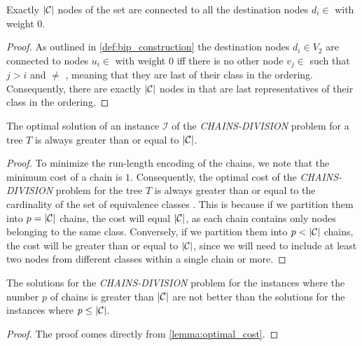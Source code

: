\begin{lemma} \label{lemma:all_destinations}
    Exactly $|\mathcal{C}|$ nodes of the set  are connected to all the destination nodes $d_i \in$ \destset with weight $0$.
\end{lemma}

\begin{proof}
    As outlined in \cref{def:bip_construction} the destination nodes $d_i \in V_2$ are connected to nodes $u_i \in$  with weight $0$ iff there is no other node $v_j \in$  such that $j > i$ and  $\neq$ , meaning that they are last of their class in the ordering. Consequently, there are exactly $|\mathcal{C}|$ nodes in  that are last representatives of their class in the ordering.
\end{proof}

\begin{lemma} \label{lemma:optimal_cost}
    The optimal solution of an instance $\mathcal{I}$ of the \textit{CHAINS-DIVISION} problem for a tree $T$ is always greater than or equal to $|\mathcal{C}|$.
\end{lemma}

\begin{proof}
    To minimize the run-length encoding of the chains, we note that the minimum cost of a chain is $1$. Consequently, the optimal cost of the \textit{CHAINS-DIVISION} problem for the tree $T$ is always greater than or equal to the cardinality of the set of equivalence classes \equivsetmath. This is because if we partition them into $p = |\mathcal{C}|$ chains, the cost will equal $|\mathcal{C}|$, as each chain contains only nodes belonging to the same class. Conversely, if we partition them into $p < |\mathcal{C}|$ chains, the cost will be greater than or equal to $|\mathcal{C}|$, since we will need to include at least two nodes from different classes within a single chain or more.
\end{proof}

\begin{claim} \label{claim:p_less_than_E}
    The solutions for the \textit{CHAINS-DIVISION} problem for the instances where the number $p$ of chains is greater than $|\mathcal{C}|$ are not better than the solutions for the instances where $p \leq |\mathcal{C}|$.
\end{claim}

\begin{proof}
    The proof comes directly from \cref{lemma:optimal_cost}.
\end{proof}

